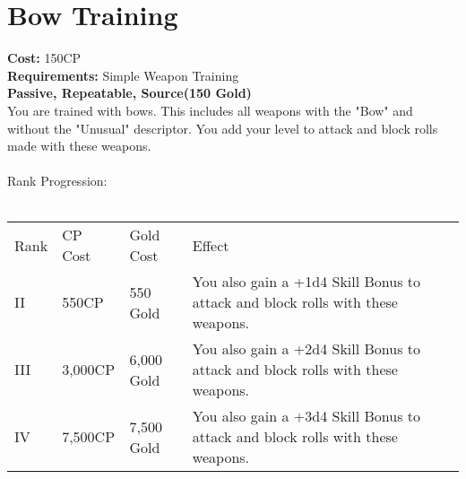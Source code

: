 \section{Bow Training}\label{perk:bowTraining}
\textbf{Cost:} 150CP\\
\textbf{Requirements:} Simple Weapon Training\\
\textbf{Passive, Repeatable, Source(150 Gold)}\\
You are trained with bows.
This includes all weapons with the "Bow" and without the "Unusual" descriptor.
You add your level to attack and block rolls made with these weapons.\\
\\
Rank Progression:\\
\\
\begin{tabular}{l | l | l | l}
	Rank & CP Cost & Gold Cost & Effect\\
	II & 550CP & 550 Gold & You also gain a +1d4 Skill Bonus to attack and block rolls with these weapons.\\
	III & 3,000CP & 6,000 Gold & You also gain a +2d4 Skill Bonus to attack and block rolls with these weapons.\\
	IV & 7,500CP & 7,500 Gold & You also gain a +3d4 Skill Bonus to attack and block rolls with these weapons.\\
\end{tabular}